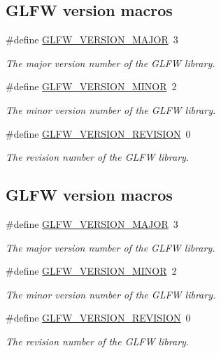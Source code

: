 \subsection*{G\+L\+FW version macros}
\begin{DoxyCompactItemize}
\item 
\#define \hyperlink{group__init_ga6337d9ea43b22fc529b2bba066b4a576}{G\+L\+F\+W\+\_\+\+V\+E\+R\+S\+I\+O\+N\+\_\+\+M\+A\+J\+OR}~3
\begin{DoxyCompactList}\small\item\em The major version number of the G\+L\+FW library. \end{DoxyCompactList}\item 
\#define \hyperlink{group__init_gaf80d40f0aea7088ff337606e9c48f7a3}{G\+L\+F\+W\+\_\+\+V\+E\+R\+S\+I\+O\+N\+\_\+\+M\+I\+N\+OR}~2
\begin{DoxyCompactList}\small\item\em The minor version number of the G\+L\+FW library. \end{DoxyCompactList}\item 
\#define \hyperlink{group__init_gab72ae2e2035d9ea461abc3495eac0502}{G\+L\+F\+W\+\_\+\+V\+E\+R\+S\+I\+O\+N\+\_\+\+R\+E\+V\+I\+S\+I\+ON}~0
\begin{DoxyCompactList}\small\item\em The revision number of the G\+L\+FW library. \end{DoxyCompactList}\end{DoxyCompactItemize}
\subsection*{G\+L\+FW version macros}
\begin{DoxyCompactItemize}
\item 
\#define \hyperlink{group__init_ga6337d9ea43b22fc529b2bba066b4a576}{G\+L\+F\+W\+\_\+\+V\+E\+R\+S\+I\+O\+N\+\_\+\+M\+A\+J\+OR}~3
\begin{DoxyCompactList}\small\item\em The major version number of the G\+L\+FW library. \end{DoxyCompactList}\item 
\#define \hyperlink{group__init_gaf80d40f0aea7088ff337606e9c48f7a3}{G\+L\+F\+W\+\_\+\+V\+E\+R\+S\+I\+O\+N\+\_\+\+M\+I\+N\+OR}~2
\begin{DoxyCompactList}\small\item\em The minor version number of the G\+L\+FW library. \end{DoxyCompactList}\item 
\#define \hyperlink{group__init_gab72ae2e2035d9ea461abc3495eac0502}{G\+L\+F\+W\+\_\+\+V\+E\+R\+S\+I\+O\+N\+\_\+\+R\+E\+V\+I\+S\+I\+ON}~0
\begin{DoxyCompactList}\small\item\em The revision number of the G\+L\+FW library. \end{DoxyCompactList}\end{DoxyCompactItemize}
